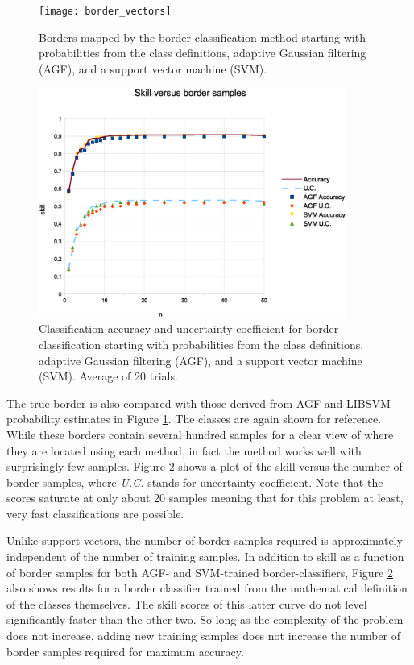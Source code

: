 \begin{figure}
\texttt{[image: border\_vectors]}
\caption{Borders mapped by the border-classification method starting with probabilities from the class definitions, adaptive Gaussian filtering (AGF), and a support vector machine (SVM).}
\label{border_vectors}
\end{figure}

\begin{figure}
\includegraphics[width=0.9\textwidth]{skill_v_nb}
\caption{Classification accuracy and uncertainty coefficient for border-classification starting with probabilities from the class definitions, adaptive Gaussian filtering (AGF), and a support vector machine (SVM). Average of 20 trials.}
\label{skill_v_nb}
\end{figure}

The true border is also compared with those derived from AGF and LIBSVM
probability estimates in Figure \ref{border_vectors}.
The classes are again shown for reference.
While these borders contain several hundred samples for a clear view of where
they are located using each method, in fact the method works well with
surprisingly few samples.  Figure \ref{skill_v_nb} shows a plot of the skill
versus the number of border samples, where {\it U.C.} stands for
uncertainty coefficient. Note that the scores saturate at only about 20
samples meaning that for this problem at least, very fast classifications are
possible.

Unlike support vectors, the number of border samples required is approximately
independent of the number of training samples.
In addition to skill as a function of border samples for both AGF- and 
SVM-trained border-classifiers, Figure \ref{skill_v_nb} also shows results
for a border classifier trained from the mathematical definition of the 
classes themselves. 
The skill scores of this latter curve do not level significantly faster than the 
other two.
So long as the complexity of
the problem does not increase, adding new training samples does not increase
the number of border samples required for maximum accuracy.


